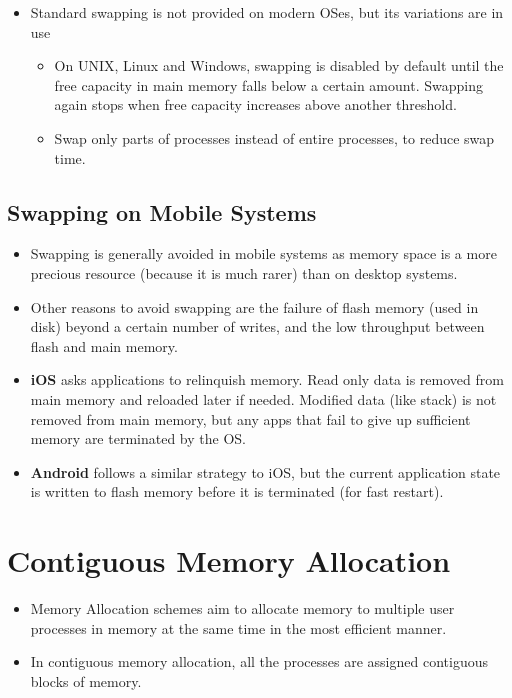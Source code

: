 \documentclass{article}
\theoremstyle{plain}
\theoremstyle{definition}
\begin{document}
\begin{itemize}
    \item Standard swapping is not provided on modern OSes, but its variations are in use
    \begin{itemize}
        \item On UNIX, Linux and Windows, swapping is disabled by default until the free capacity in main memory falls below a certain amount. Swapping again stops when free capacity increases above another threshold.
        
        \item Swap only parts of processes instead of entire processes, to reduce swap time. 
    \end{itemize}
\end{itemize}

\subsection{Swapping on Mobile Systems}
\begin{itemize}
    \item Swapping is generally avoided in mobile systems as memory space is a more precious resource (because it is much rarer) than on desktop systems. 
    
    \item Other reasons to avoid swapping are the failure of flash memory (used in disk) beyond a certain number of writes, and the low throughput between flash and main memory.
    
    \item \textbf{iOS} asks applications to relinquish memory. Read only data is removed from main memory and reloaded later if needed. Modified data (like stack) is not removed from main memory, but any apps that fail to give up sufficient memory are terminated by the OS.
    
    \item \textbf{Android} follows a similar strategy to iOS, but the current application state is written to flash memory before it is terminated (for fast restart).
\end{itemize}

\section{Contiguous Memory Allocation}
\begin{itemize}
    \item Memory Allocation schemes aim to allocate memory to multiple user processes in memory at the same time in the most efficient manner. 
    
    \item In contiguous memory allocation, all the processes are assigned contiguous blocks of memory. 
\end{itemize}
\end{document}
